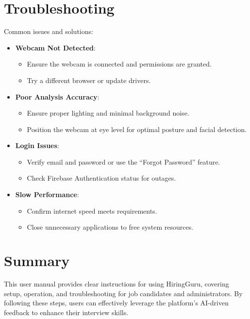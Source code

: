 \section{Troubleshooting}
Common issues and solutions:
\begin{itemize}
    \item \textbf{Webcam Not Detected}:
        \begin{itemize}
            \item Ensure the webcam is connected and permissions are granted.
            \item Try a different browser or update drivers.
        \end{itemize}
    \item \textbf{Poor Analysis Accuracy}:
        \begin{itemize}
            \item Ensure proper lighting and minimal background noise.
            \item Position the webcam at eye level for optimal posture and facial detection.
        \end{itemize}
    \item \textbf{Login Issues}:
        \begin{itemize}
            \item Verify email and password or use the ``Forgot Password'' feature.
            \item Check Firebase Authentication status for outages.
        \end{itemize}
    \item \textbf{Slow Performance}:
        \begin{itemize}
            \item Confirm internet speed meets requirements.
            \item Close unnecessary applications to free system resources.
        \end{itemize}
\end{itemize}

\section{Summary}
This user manual provides clear instructions for using HiringGuru, covering setup, operation, and troubleshooting for job candidates and administrators. By following these steps, users can effectively leverage the platform’s AI-driven feedback to enhance their interview skills.